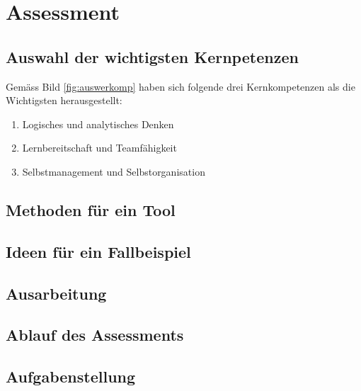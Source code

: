 \chapter{Assessment}

\section{Auswahl der wichtigsten Kernpetenzen}

Gemäss Bild \ref{fig:auswerkomp} haben sich folgende drei Kernkompetenzen als die Wichtigsten herausgestellt:

\begin{enumerate} 
\item{Logisches und analytisches Denken}
\item{Lernbereitschaft und Teamfähigkeit}
\item{Selbstmanagement und Selbstorganisation}
\end{enumerate}

\section{Methoden für ein Tool}

\section{Ideen für ein Fallbeispiel}

\section{Ausarbeitung}

\section{Ablauf des Assessments}

\section{Aufgabenstellung}